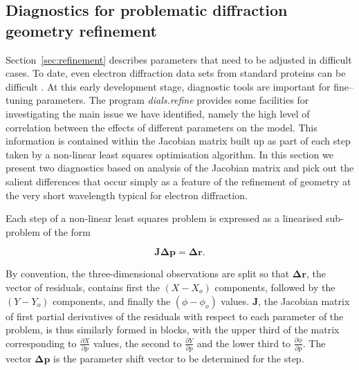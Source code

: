 \documentclass[preprint]{iucr}
\newcommand{\dialsrefine}{\emph{dials.refine}\xspace}
\renewcommand{\vec}[1]{\mathbf{#1}}
\newcommand{\mat}[1]{\mathbf{#1}}
\newcommand{\pder}[2][]{\frac{\partial#1}{\partial#2}}
\begin{document}
\subsection{Diagnostics for problematic diffraction geometry refinement
\label{sec:diag}}

Section~\ref{sec:refinement} describes parameters that need to be adjusted in
difficult cases. To date, even electron diffraction data sets from standard
proteins can be difficult \cite{Clabbers2017,Hattne2015}. At this early
development stage, diagnostic tools are important for fine--tuning parameters.
The program \dialsrefine provides some facilities for investigating the main
issue we have identified, namely the high level of correlation between the
effects of different parameters on the model. This information is contained
within the Jacobian matrix built up as part of each step taken by a non-linear
least squares optimisation algorithm. In this section we present two
diagnostics based on analysis of the Jacobian matrix and pick out the salient
differences that occur simply as a feature of the refinement of geometry at the
very short wavelength typical for electron diffraction.

Each step of a non-linear least squares problem is expressed as a linearised
sub-problem of the form

\begin{equation}
  \label{eq:linearised_step}
  \mat{J} \vec{\Delta p} = \vec{\Delta r}.
\end{equation}

By convention, the three-dimensional observations are split so that
$\vec{\Delta r}$, the vector of residuals, contains first the $(X - X_o)$
components, followed by the $(Y - Y_o)$ components, and finally the $(\phi -
\phi_o)$ values. $\mat{J}$, the Jacobian matrix of first partial derivatives of
the residuals with respect to each parameter of the problem, is thus similarly
formed in blocks, with the upper third of the matrix corresponding to
$\pder[X]{p}$ values, the second to $\pder[Y]{p}$ and the lower third to
$\pder[\phi]{p}$. The vector $\vec{\Delta p}$ is the parameter shift vector to
be determined for the step.
\end{document}
